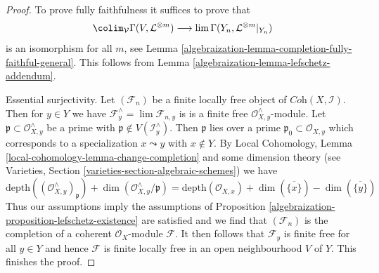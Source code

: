 \begin{proof}

To prove fully faithfulness it suffices to prove that
$$
\colim_\mathcal{V} \Gamma(V, \mathcal{L}^{\otimes m})
\longrightarrow
\lim \Gamma(Y_n, \mathcal{L}^{\otimes m}|_{Y_n})
$$
is an isomorphism for all $m$, see
Lemma \ref{algebraization-lemma-completion-fully-faithful-general}.
This follows from Lemma \ref{algebraization-lemma-lefschetz-addendum}.

\medskip\noindent
Essential surjectivity. Let $(\mathcal{F}_n)$ be a finite locally
free object of $\textit{Coh}(X, \mathcal{I})$. Then for $y \in Y$ we have
$\mathcal{F}_y^\wedge = \lim \mathcal{F}_{n, y}$ is
is a finite free $\mathcal{O}_{X, y}^\wedge$-module.
Let $\mathfrak p \subset \mathcal{O}_{X, y}^\wedge$
be a prime with $\mathfrak p \not \in V(\mathcal{I}_y^\wedge)$.
Then $\mathfrak p$ lies over a prime $\mathfrak p_0 \subset \mathcal{O}_{X, y}$
which corresponds to a specialization $x \leadsto y$ with
$x \not \in Y$. By Local Cohomology, Lemma
\ref{local-cohomology-lemma-change-completion}
and some dimension theory
(see Varieties, Section \ref{varieties-section-algebraic-schemes})
we have
$$
\text{depth}((\mathcal{O}_{X, y}^\wedge)_\mathfrak p) +
\dim(\mathcal{O}_{X, y}^\wedge/\mathfrak p) =
\text{depth}(\mathcal{O}_{X, x}) +
\dim(\overline{\{x\}}) - \dim(\overline{\{y\}})
$$
Thus our assumptions imply the assumptions of
Proposition \ref{algebraization-proposition-lefschetz-existence}
are satisfied and we find that $(\mathcal{F}_n)$
is the completion of a coherent $\mathcal{O}_X$-module $\mathcal{F}$.
It then follows that $\mathcal{F}_y$ is finite free for all $y \in Y$
and hence $\mathcal{F}$ is finite locally free in an open
neighbourhood $V$ of $Y$. This finishes the proof.
\end{proof}




